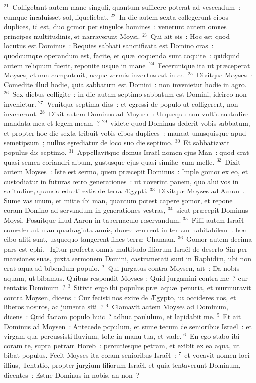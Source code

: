 ${}^{21}$~Colligebant autem mane singuli, quantum sufficere poterat ad vescendum~: cumque incaluisset sol, liquefiebat.
${}^{22}$~In die autem sexta collegerunt cibos duplices, id est, duo gomor per singulos homines~: venerunt autem omnes principes multitudinis, et narraverunt Moysi.
${}^{23}$~Qui ait eis~: Hoc est quod locutus est Dominus~: Requies sabbati sanctificata est Domino cras~: quodcumque operandum est, facite, et qu\ae\ coquenda sunt coquite~: quidquid autem reliquum fuerit, reponite usque in mane.
${}^{24}$~Feceruntque ita ut pr\ae ceperat Moyses, et non computruit, neque vermis inventus est in eo.
${}^{25}$~Dixitque Moyses~: Comedite illud hodie, quia sabbatum est Domini~: non invenietur hodie in agro.
${}^{26}$~Sex diebus colligite~: in die autem septimo sabbatum est Domini, idcirco non invenietur.
${}^{27}$~Venitque septima dies~: et egressi de populo ut colligerent, non invenerunt.
${}^{28}$~Dixit autem Dominus ad Moysen~: Usquequo non vultis custodire mandata mea et legem meam~?
${}^{29}$~videte quod Dominus dederit vobis sabbatum, et propter hoc die sexta tribuit vobis cibos duplices~: maneat unusquisque apud semetipsum~; nullus egrediatur de loco suo die septimo.
${}^{30}$~Et sabbatizavit populus die septimo.
${}^{31}$~Appellavitque domus Isra\"el nomen ejus Man~: quod erat quasi semen coriandri album, gustusque ejus quasi simil\ae\ cum melle.
${}^{32}$~Dixit autem Moyses~: Iste est sermo, quem pr\ae cepit Dominus~: Imple gomor ex eo, et custodiatur in futuras retro generationes~: ut noverint panem, quo alui vos in solitudine, quando educti estis de terra \AE gypti.
${}^{33}$~Dixitque Moyses ad Aaron~: Sume vas unum, et mitte ibi man, quantum potest capere gomor, et repone coram Domino ad servandum in generationes vestras,
${}^{34}$~sicut pr\ae cepit Dominus Moysi. Posuitque illud Aaron in tabernaculo reservandum.
${}^{35}$~Filii autem Isra\"el comederunt man quadraginta annis, donec venirent in terram habitabilem~: hoc cibo aliti sunt, usquequo tangerent fines terr\ae\ Chanaan.
${}^{36}$~Gomor autem decima pars est ephi.
~\lettrine[lines=10,image=true,loversize=0.05,lraise=-0.03]{I}{}gitur profecta omnis multitudo filiorum Isra\"el de deserto Sin per mansiones suas, juxta sermonem Domini, castrametati sunt in Raphidim, ubi non erat aqua ad bibendum populo.
${}^{2}$~Qui jurgatus contra Moysen, ait~: Da nobis aquam, ut bibamus. Quibus respondit Moyses~: Quid jurgamini contra me~? cur tentatis Dominum~?
${}^{3}$~Sitivit ergo ibi populus pr\ae\ aqu\ae\ penuria, et murmuravit contra Moysen, dicens~: Cur fecisti nos exire de \AE gypto, ut occideres nos, et liberos nostros, ac jumenta siti~?
${}^{4}$~Clamavit autem Moyses ad Dominum, dicens~: Quid faciam populo huic~? adhuc paululum, et lapidabit me.
${}^{5}$~Et ait Dominus ad Moysen~: Antecede populum, et sume tecum de senioribus Isra\"el~: et virgam qua percussisti fluvium, tolle in manu tua, et vade.
${}^{6}$~En ego stabo ibi coram te, supra petram Horeb~: percutiesque petram, et exibit ex ea aqua, ut bibat populus. Fecit Moyses ita coram senioribus Isra\"el~:
${}^{7}$~et vocavit nomen loci illius, Tentatio, propter jurgium filiorum Isra\"el, et quia tentaverunt Dominum, dicentes~: Estne Dominus in nobis, an non~?


